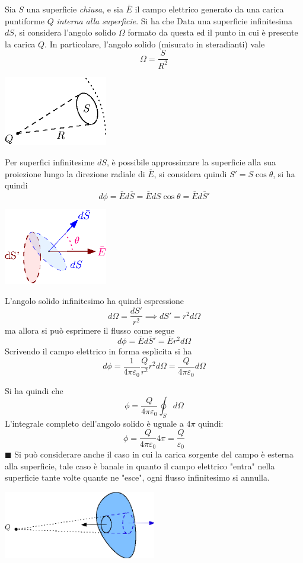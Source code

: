 \documentclass[10pt, letterpaper]{report}
\begin{document}
 Sia $S$ una superficie \textit{chiusa}, e sia $\bar E$ il campo elettrico generato da una carica puntiforme $Q$ \textit{interna alla superficie}. Si ha che 
\dimo{}
Data una superficie infinitesima $dS$, si considera l'angolo solido $\Omega$ formato da questa ed il punto in cui è presente la carica $Q$. In particolare, l'angolo solido (misurato in steradianti) vale 
$$ \Omega = \frac{S}{R^2}$$
\begin{center}
    \includegraphics[width=0.34\textwidth]{images/angoloSolido.eps}
\end{center}
Per superfici infinitesime $dS$, è possibile approssimare la superficie alla sua proiezione lungo la direzione radiale di $\bar E$, si considera quindi $S'=S\cos\theta$, si ha quindi 
$$ d\phi=\bar Ed\bar S = \bar EdS\cos\theta = \bar E d\bar S'$$
\begin{center}
    \includegraphics[width=0.34\textwidth]{images/approssAngolo.eps}
\end{center}
L'angolo solido infinitesimo ha quindi espressione 
$$ d\Omega=\frac{dS'}{r^2}\implies dS'=r^2d\Omega$$
ma allora si può esprimere il flusso come segue 
$$ d\phi=\bar E d\bar S'=\bar Er^2d\Omega$$
Scrivendo il campo elettrico in forma esplicita si ha 
$$d\phi= \frac{1}{4\pi\varepsilon_0}\frac{Q}{r^2}r^2d\Omega=\frac{Q}{4\pi\varepsilon_0}d\Omega$$
\begin{quote}
\end{quote}
Si ha quindi che 
$$\phi = \frac{Q}{4\pi\varepsilon_0}\oint_Sd\Omega$$ 
L'integrale completo dell'angolo solido è uguale a $4\pi$ quindi:$$\phi=\frac{Q}{4\pi\varepsilon_0}4\pi = \frac{Q}{\varepsilon_0}$$
\hfill $\blacksquare$ \acc
Si può considerare anche il caso in cui la carica sorgente del campo è esterna alla superficie, tale caso è banale in quanto il campo elettrico "entra" nella superficie tante volte quante ne "esce", ogni flusso infinitesimo si annulla.\begin{center}
    \includegraphics[width=0.5\textwidth]{images/caricaEst.eps}
\end{center}
\end{document}
